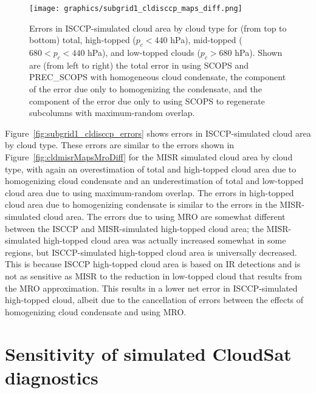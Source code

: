 \begin{figure}[htbp]
\centering
\texttt{[image: graphics/subgrid1\_cldisccp\_maps\_diff.png]}
\caption{\label{fig:subgrid1_cldisccp_errors}Errors in ISCCP-simulated
cloud area by cloud type for (from top to bottom) total, high-topped
(\(p_c < 440\) hPa), mid-topped (\(680 < p_c < 440\) hPa), and
low-topped clouds (\(p_c > 680\) hPa). Shown are (from left to right)
the total error in using SCOPS and PREC\_SCOPS with homogeneous cloud
condensate, the component of the error due only to homogenizing the
condensate, and the component of the error due only to using SCOPS to
regenerate subcolumns with maximum-random
overlap.}\label{fig:subgrid1ux5fcldisccpux5ferrors}
\end{figure}

Figure~\ref{fig:subgrid1_cldisccp_errors} shows errors in
ISCCP-simulated cloud area by cloud type. These errors are similar to
the errors shown in Figure~\ref{fig:cldmisrMapsMroDiff} for the MISR
simulated cloud area by cloud type, with again an overestimation of
total and high-topped cloud area due to homogenizing cloud condensate
and an underestimation of total and low-topped cloud area due to using
maximum-random overlap. The errors in high-topped cloud area due to
homogenizing condensate is similar to the errors in the MISR-simulated
cloud area. The errors due to using MRO are somewhat different between
the ISCCP and MISR-simulated high-topped cloud area; the MISR-simulated
high-topped cloud area was actually increased somewhat in some regions,
but ISCCP-simulated high-topped cloud area is universally decreased.
This is because ISCCP high-topped cloud area is based on IR detections
and is not as sensitive as MISR to the reduction in low-topped cloud
that results from the MRO approximation. This results in a lower net
error in ISCCP-simulated high-topped cloud, albeit due to the
cancellation of errors between the effects of homogenizing cloud
condensate and using MRO.

\section{Sensitivity of simulated CloudSat
diagnostics}\label{sensitivity-of-simulated-cloudsat-diagnostics}

